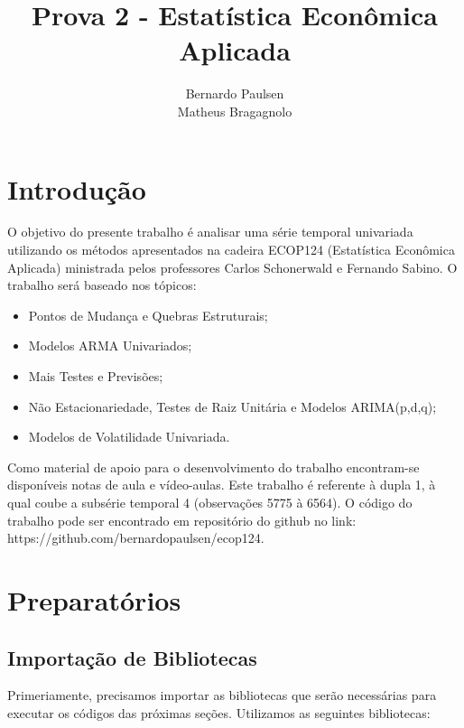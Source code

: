 \documentclass{article}\usepackage[]{graphicx}\usepackage[]{color}
\author{Bernardo Paulsen \\ Matheus Bragagnolo}
\title{Prova 2 - Estatística Econômica Aplicada}
\date{ }
\begin{document}
\maketitle

\tableofcontents


\section{Introdução}

    O objetivo do presente trabalho é analisar uma série temporal univariada utilizando os métodos apresentados na cadeira ECOP124 (Estatística Econômica Aplicada) ministrada pelos professores Carlos Schonerwald e Fernando Sabino. O trabalho será baseado nos tópicos:
    
    \begin{itemize}
        \item Pontos de Mudança e Quebras Estruturais;
        \item Modelos ARMA Univariados;
        \item Mais Testes e Previsões;
        \item Não Estacionariedade, Testes de Raiz Unitária e Modelos ARIMA(p,d,q);
        \item Modelos de Volatilidade Univariada.
    \end{itemize}
    
    Como material de apoio para o desenvolvimento do trabalho encontram-se disponíveis notas de aula e vídeo-aulas. Este trabalho é referente à dupla 1, à qual coube a subsérie temporal 4 (observações 5775 à 6564). O código do trabalho pode ser encontrado em repositório do github no link: https://github.com/bernardopaulsen/ecop124.


\section{Preparatórios}

    \subsection{Importação de Bibliotecas}

        Primeriamente, precisamos importar as bibliotecas que serão necessárias para executar os códigos das próximas seções. Utilizamos as seguintes bibliotecas:
    
\end{document}
